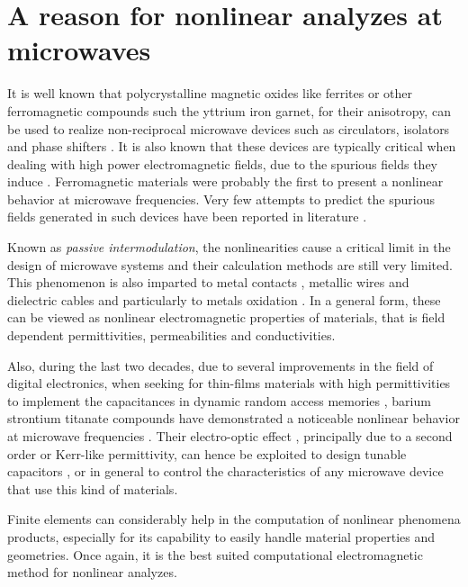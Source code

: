 \section{A reason for nonlinear analyzes at microwaves}

It is well known that polycrystalline magnetic oxides like ferrites or other ferromagnetic compounds such the yttrium iron garnet, for their anisotropy, can be used to realize non-reciprocal microwave devices such as circulators, isolators and phase shifters \cite{pozar1998microwave, adam2002ferrite}. It is also known that these devices are typically critical when dealing with high power electromagnetic fields, due to the spurious fields they induce \cite{suhl1956nonlinear, suhl1957theory, bailey1979study}. Ferromagnetic materials were probably the first to present a nonlinear behavior at microwave frequencies. Very few attempts to predict the spurious fields generated in such devices have been reported in literature \cite{wu1976study, how1997nonlinear}.

Known as \textit{passive intermodulation}, the nonlinearities cause a critical limit in the design of microwave systems \cite{sanford1993passive} and their calculation methods are still very limited. This phenomenon is also imparted to metal contacts \cite{arazm1980nonlinearities}, metallic wires and dielectric cables \cite{amin1978coaxial} and particularly to metals oxidation \cite{bond1979intermodulation}. In a general form, these can be viewed as nonlinear electromagnetic properties of materials, that is field dependent permittivities, permeabilities and conductivities.

Also, during the last two decades, due to several improvements in the field of digital electronics, when seeking for thin-films materials with high permittivities to implement the capacitances in dynamic random access memories \cite{scott1994dielectric, shaw1999effect}, barium strontium titanate compounds have demonstrated a noticeable nonlinear behavior at microwave frequencies \cite{kozyrev1997ferroelectric, mateu2006measurements, mateu2007frequency, giere2007characterization}. Their electro-optic effect \cite{takeda2010dielectric}, principally due to a second order or Kerr-like permittivity, can hence be exploited to design tunable capacitors \cite{sigman2008voltage}, or in general to control the characteristics of any microwave device that use this kind of materials.

Finite elements can considerably help in the computation of nonlinear phenomena products, especially for its capability to easily handle material properties and geometries. Once again, it is the best suited computational electromagnetic method for nonlinear analyzes.

